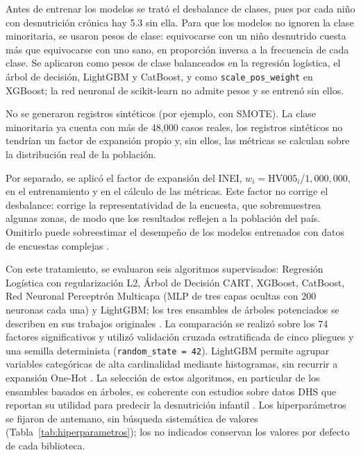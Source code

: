 \documentclass[final,5p,times,twocolumn,number,lefttitle]{elsarticle}
\begin{document}
Antes de entrenar los modelos se trató el desbalance de clases, pues por cada niño con desnutrición crónica hay 5.3 sin ella. Para que los modelos no ignoren la clase minoritaria, se usaron pesos de clase: equivocarse con un niño desnutrido cuesta más que equivocarse con uno sano, en proporción inversa a la frecuencia de cada clase. Se aplicaron como pesos de clase balanceados en la regresión logística, el árbol de decisión, LightGBM y CatBoost, y como \texttt{scale\_pos\_weight} en XGBoost; la red neuronal de scikit-learn no admite pesos y se entrenó sin ellos.

No se generaron registros sintéticos (por ejemplo, con SMOTE). La clase minoritaria ya cuenta con más de 48,000 casos reales, los registros sintéticos no tendrían un factor de expansión propio y, sin ellos, las métricas se calculan sobre la distribución real de la población.

Por separado, se aplicó el factor de expansión del INEI, $w_i=\mathrm{HV005}_i/1{,}000{,}000$, en el entrenamiento y en el cálculo de las métricas. Este factor no corrige el desbalance: corrige la representatividad de la encuesta, que sobremuestrea algunas zonas, de modo que los resultados reflejen a la población del país. Omitirlo puede sobreestimar el desempeño de los modelos entrenados con datos de encuestas complejas \citep{macnell2023weights}.

Con este tratamiento, se evaluaron seis algoritmos supervisados: Regresión Logística con regularización L2, Árbol de Decisión CART, XGBoost, CatBoost, Red Neuronal Perceptrón Multicapa (MLP de tres capas ocultas con 200 neuronas cada una) y LightGBM; los tres ensambles de árboles potenciados se describen en sus trabajos originales \citep{chen2016xgboost,prokhorenkova2018catboost,ke2017lightgbm}. La comparación se realizó sobre los 74 factores significativos y utilizó validación cruzada estratificada de cinco pliegues y una semilla determinista (\texttt{random\_state = 42}). LightGBM permite agrupar variables categóricas de alta cardinalidad mediante histogramas, sin recurrir a expansión One-Hot \citep{bentejac2021gradientboosting}. La selección de estos algoritmos, en particular de los ensambles basados en árboles, es coherente con estudios sobre datos DHS que reportan su utilidad para predecir la desnutrición infantil \citep{bitew2021ethiopia,talukder2020bangladesh,chilyabanyama2022zambia}. Los hiperparámetros se fijaron de antemano, sin búsqueda sistemática de valores (Tabla~\ref{tab:hiperparametros}); los no indicados conservan los valores por defecto de cada biblioteca.
\end{document}
